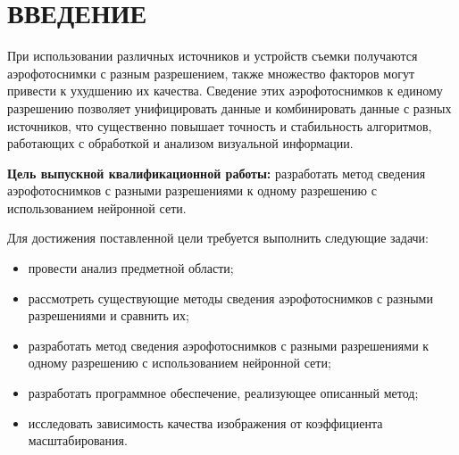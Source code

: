 \chapter*{ВВЕДЕНИЕ}

При использовании различных источников и устройств съемки получаются аэрофотоснимки с разным разрешением, также множество факторов могут привести к ухудшению их качества. Сведение этих аэрофотоснимков к единому разрешению позволяет унифицировать данные и комбинировать данные с разных источников, что существенно повышает точность и стабильность алгоритмов, работающих с обработкой и анализом визуальной информации.

\textbf{Цель выпускной квалификационной работы:} разработать метод сведения аэрофотоснимков с разными разрешениями к одному разрешению с использованием нейронной сети.

Для достижения поставленной цели требуется выполнить следующие задачи:

\begin{itemize}[label=---]
    \item провести анализ предметной области;
    \item рассмотреть существующие методы сведения аэрофотоснимков с разными разрешениями и сравнить их;
    \item разработать метод сведения аэрофотоснимков с разными разрешениями к одному разрешению с использованием нейронной сети;
    \item разработать программное обеспечение, реализующее описанный метод;
    \item исследовать зависимость качества изображения от коэффициента масштабирования.
\end{itemize}